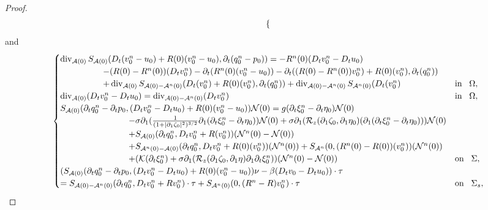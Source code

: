 \documentclass[letterpaper,reqno,10pt,twoside]{amsart}
\theoremstyle{definition}
\theoremstyle{remark}
\def\p{\partial}
\begin{document}
\begin{appendix}
\begin{proof}
\begin{align}{\label{eq:converge_n0}}
\begin{cases}
					\end{cases}
				\end{align}
				\noindent and
				\begin{align}{\label{eq:converge_n1}}
					\begin{cases}
						\operatorname{div}_{\mathcal{A}(0)}S_{\mathcal{A}(0)}(D_{t}(v_{0}^{n}-u_{0})+R(0)(v_{0}^{n}-u_{0}),\p_{t}(q_{0}^{n}-p_{0}))=-R^{n}(0)(D_{t}v_{0}^{n}-D_{t}u_{0})\\
						\quad\quad\quad\quad\quad-(R(0)-R^{n}(0))(D_{t}v_{0}^{n})-\p_{t}(R^{n}(0)(v_{0}^{n}-u_{0}))-\p_{t}((R(0)-R^{n}(0))v_{0}^{n})+R(0)(v_{0}^{n}),\p_{t}(q_{0}^{n}))\\
						\quad\quad\quad\quad\quad+\operatorname{div}_{\mathcal{A}(0)}S_{\mathcal{A}(0)-\mathcal{A}^{n}(0)}(D_{t}(v_{0}^{n})+R(0)(v_{0}^{n}),\p_{t}(q_{0}^{n}))+\operatorname{div}_{\mathcal{A}(0)-\mathcal{A}^{n}(0)}S_{\mathcal{A}^{n}(0)}(D_{t}(v_{0}^{n})~~~&\operatorname{in}~~\Omega,\\
						\operatorname{div}_{\mathcal{A}(0)}(D_{t}v_{0}^{n}-D_{t}u_{0})=\operatorname{div}_{\mathcal{A}(0)-\mathcal{A}^{n}(0)}(D_{t}v_{0}^{n} )~~~&\operatorname{in}~~\Omega,\\
						S_{\mathcal{A}(0)}(\p_{t}q_{0}^{n}-\p_{t}p_{0},(D_{t}v_{0}^{n}-D_{t}u_{0})+R(0)(v_{0}^{n}-u_{0}))\mathcal{N}(0)=g(\p_{t}\xi_{0}^{n}-\p_{t}\eta_{0})\mathcal{N}(0)\\
						\quad\quad\quad\quad\quad\quad\quad\quad-\sigma\partial_{1}(\frac{1}{(1+\vert \partial_{1}\zeta_{0}\vert^{2})^{3/2}}\partial_{1}(\p_{t}\xi_{0}^{n}-\p_{t}\eta_{0}))\mathcal{N}(0)+\sigma\partial_{1}(\mathcal{R}_{z}(\partial_{1}\zeta_{0},\partial_{1}\eta_{0})(\partial_{1}(\p_{t}\xi_{0}^{n}-\p_{t}\eta_{0})))\mathcal{N}(0)
						\\
						\quad\quad\quad\quad\quad\quad\quad\quad+S_{\mathcal{A}(0)}(\p_{t}q_{0}^{n},D_{t}v_{0}^{n}+R(v_{0}^{n}))(\mathcal{N}^{n}(0)-\mathcal{N}(0))\\
						\quad\quad\quad\quad\quad\quad\quad\quad+S_{\mathcal{A}^{n}(0)-\mathcal{A}(0)}(\p_{t}q_{0}^{n},D_{t}v_{0}^{n}+R(0)(v_{0}^{n}))(\mathcal{N}^{n}(0))+S_{\mathcal{A}^{n}}(0,(R^{n}(0)-R(0))(v_{0}^{n}))(\mathcal{N}^{n}(0))\\
						\quad\quad\quad\quad\quad\quad\quad\quad+(\mathcal{K}(\p_{t}\xi_{0}^{n})+\sigma\p_{1}(\mathcal{R}_{z}(\p_{1}\zeta_{0},\p_{1}\eta)\p_{1}\p_{t}\xi_{0}^{n}))(\mathcal{N}^{n}(0)-\mathcal{N}(0))~~~&\operatorname{on}~~\Sigma,\\
						(S_{\mathcal{A}(0)}(\p_{t}q_{0}^{n}-\p_{t}p_{0},(D_{t}v_{0}^{n}-D_{t}u_{0})+R(0)(v_{0}^{n}-u_{0}))\nu-\beta (D_{t}v_{0}-D_{t}u_{0}))\cdot \tau\\=S_{\mathcal{A}(0)-\mathcal{A}^{n}(0)}(\p_{t}q_{0}^{n},D_{t}v_{0}^{n}+Rv_{0}^{n})\cdot \tau+S_{\mathcal{A}^{n}(0)}(0,(R^{n}-R)v_{0}^{n})\cdot \tau~~~&\operatorname{on}~~\Sigma_{s},\\

\end{cases}
\end{align}
\end{proof}
\end{appendix}
\end{document}
